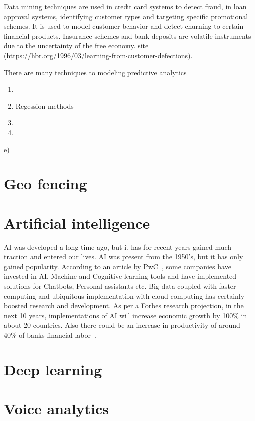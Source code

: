Data mining techniques are used in credit card systems to detect fraud, in loan approval systems, identifying customer types and targeting specific promotional schemes. It is used to model customer behavior and detect churning to certain financial products. Insurance schemes and bank deposits are volatile instruments due to the uncertainty of the free economy. site (https://hbr.org/1996/03/learning-from-customer-defections).


There are many techniques to modeling predictive analytics 


\begin{enumerate}
	\item 
	\item Regession methods
	\item 
	\item 
\end{enumerate}e)

%
%
%
%
\section{Geo fencing}

\section{Artificial intelligence}
AI was developed a long time ago, but it has for recent years gained much traction and entered our lives. AI was present from the 1950's, but it has only gained popularity.
According to an article by PwC~, some companies have invested in AI, Machine and Cognitive learning tools and have implemented solutions for Chatbots, Personal assistants etc. Big data coupled with faster computing and ubiquitous implementation with cloud computing has certainly boosted research and development.
As per a Forbes research projection, in the next 10 years, implementations of AI will increase economic growth by 100\% in about 20 countries. Also there could be an increase in productivity of around 40\% of banks financial labor~.


\section{Deep learning}

\section{Voice analytics}

